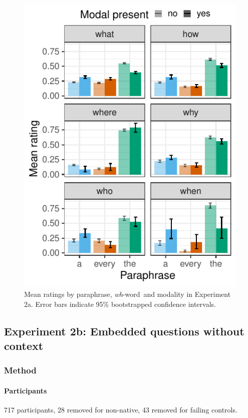 \documentclass[12pt,letterpaper,table,svgnames,dvipsnames]{article}
\newcommand{\whw}{\emph{wh}-word~}
\begin{document}
\begin{figure}[h!]
\centering
\includegraphics[scale=1]{figures/modxwh_nocontext_root.pdf}
\caption{Mean ratings by paraphrase, \whw and modality in Experiment 2a. Error bars indicate 95\% bootstrapped confidence intervals.} 
\label{ex2a_modXwh}
\end{figure}







\subsection{Experiment 2b: Embedded questions without context}

\subsubsection{Method}

\paragraph{Participants}
717 participants, 28 removed for non-native, 43 removed for failing controls.
\end{document}
